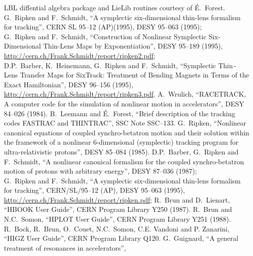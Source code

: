 \begin{thebibliography}{99}
        LBL diffential algebra package and LieLib routines courtesy of \'{E}.~Forest.
        G.~Ripken and F.~Schmidt,
        ``A symplectic six-dimensional thin-lens formalism for tracking'',
        CERN SL 95--12 (AP)(1995), DESY 95--063 (1995);\\
        G.~Ripken and F.~Schmidt,
        ``Construction of Nonlinear Symplectic Six-Dimensional Thin-Lens Maps by Exponentiation'',
        DESY 95--189 (1995), \url{http://cern.ch/Frank.Schmidt/report/ripken2.pdf};\\
        D.P.~Barber, K.~Heinemann, G.~Ripken and F.~Schmidt,
        ``Symplectic Thin\,-\,Lens Transfer Maps for SixTrack: Treatment of  Bending Magnets in Terms of the Exact Hamiltonian'',
        DESY 96--156 (1995), \url{http://cern.ch/Frank.Schmidt/report/ripken3.pdf}.
        A.~Wrulich,
        ``RACETRACK, A computer code for the simulation of nonlinear motion in accelerators'',
        DESY 84--026 (1984).
        B.~Leemann and \'{E}.~Forest,
        ``Brief description of the tracking codes FASTRAC and THINTRAC'',
        SSC Note SSC--133.
        G.~Ripken,
        ``Nonlinear canonical equations of coupled synchro-betatron motion and their solution within the framework of a nonlinear 6-dimensional (symplectic) tracking program for ultra-relativistic protons'',
        DESY 85--084 (1985).
        D.P.~Barber, G.~Ripken and F.~Schmidt,
        ``A nonlinear canonical formalism for the coupled synchro-betatron motion of protons with arbitrary energy'',
        DESY 87--036 (1987);\\
        G.~Ripken and F.~Schmidt,
        ``A symplectic six-dimensional thin-lens formalism for tracking'',
        CERN/SL/95--12 (AP), DESY 95--063 (1995), \url{http://cern.ch/Frank.Schmidt/report/ripken.pdf};
        R.~Brun and D.~Lienart,
        ``HBOOK User Guide'',
        CERN Program Library Y250 (1987).
        R.~Brun and N.C.~Somon,
        ``HPLOT User Guide'',
        CERN Program Library Y251 (1988).
        R.~Bock, R.~Brun, O.~Couet, N.C.~Somon, C.E. Vandoni and P. Zanarini,
        ``HIGZ User Guide'',
        CERN Program Library Q120.
        G.~Guignard,
        ``A general treatment of resonances in accelerators'',

\end{thebibliography}
